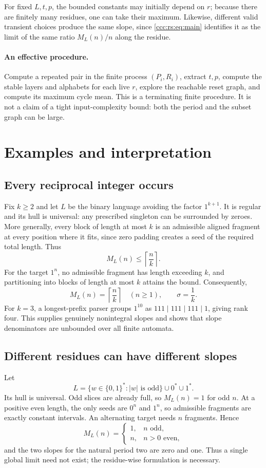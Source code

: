 \documentclass[11pt,letterpaper]{article}
\theoremstyle{definition}
\theoremstyle{remark}
\begin{document}
For fixed $L,t,p$, the bounded constants may initially depend on $r$; because there are finitely many residues, one can take their maximum. Likewise, different valid transient choices produce the same slope, since \eqref{ccc:rs:eq:main} identifies it as the limit of the same ratio $M_L(n)/n$ along the residue.

\paragraph{An effective procedure.}
Compute a repeated pair in the finite process $(P_i,R_i)$, extract $t,p$, compute the stable layers and alphabets for each live $r$, explore the reachable reset graph, and compute its maximum cycle mean. This is a terminating finite procedure. It is not a claim of a tight input-complexity bound: both the period and the subset graph can be large.

\section{Examples and interpretation}\label{ccc:rs:sec:examples}

\subsection{Every reciprocal integer occurs}
Fix $k\ge2$ and let $L$ be the binary language avoiding the factor $1^{k+1}$. It is regular and its hull is universal: any prescribed singleton can be surrounded by zeroes. More generally, every block of length at most $k$ is an admissible aligned fragment at every position where it fits, since zero padding creates a seed of the required total length. Thus
\[
M_L(n)\le\left\lceil\frac nk\right\rceil.
\]
For the target $1^n$, no admissible fragment has length exceeding $k$, and partitioning into blocks of length at most $k$ attains the bound. Consequently,
\[
M_L(n)=\left\lceil\frac nk\right\rceil\quad(n\ge1),
\qquad \sigma=\frac1k.
\]
For $k=3$, a longest-prefix parser groups $1^{10}$ as $111\mid111\mid111\mid1$, giving rank four. This supplies genuinely nonintegral slopes and shows that slope denominators are unbounded over all finite automata.

\subsection{Different residues can have different slopes}
Let
\[
L=\{w\in\{0,1\}^*:|w|\text{ is odd}\}\cup0^*\cup1^*.
\]
Its hull is universal. Odd slices are already full, so $M_L(n)=1$ for odd $n$. At a positive even length, the only seeds are $0^n$ and $1^n$, so admissible fragments are exactly constant intervals. An alternating target needs $n$ fragments. Hence
\[
M_L(n)=
\begin{cases}
1,&n\text{ odd},\\
n,&n>0\text{ even},
\end{cases}
\]
and the two slopes for the natural period two are zero and one. Thus a single global limit need not exist; the residue-wise formulation is necessary.
\end{document}
